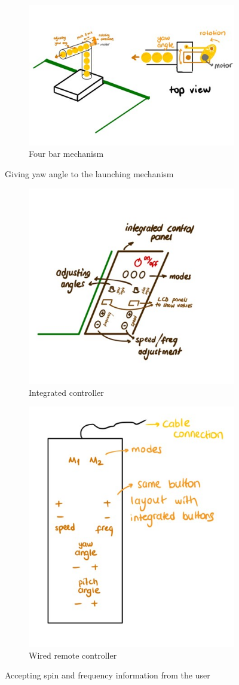 \documentclass[12pt]{article}
\begin{document}
\begin{figure}[H]
\begin{subfigure}{.5\textwidth}
  \centering
  \includegraphics[width=.4\linewidth]{fourbaryaw.jpg}
  \caption{Four bar mechanism}
  \label{fig:fourbar_yaw}
\end{subfigure}%

\caption{Giving yaw angle to the launching mechanism  }
\label{fig:yaw}
\end{figure}

\begin{figure}[H]
\centering
\begin{subfigure}{.3\textwidth}
  \centering
  \includegraphics[width=.3\linewidth]{integratedcontroller.jpg}
  \caption{Integrated controller}
  \label{fig:integrated}
\end{subfigure}%
\begin{subfigure}{.3\textwidth}
  \centering
  \includegraphics[width=.3\linewidth]{wiredremote.jpg}
  \caption{Wired remote controller}
  \label{fig:wired}
\end{subfigure}

\caption{Accepting spin and frequency information from the user}
\label{fig:accept_spin_freq}
\end{figure}
\end{document}
